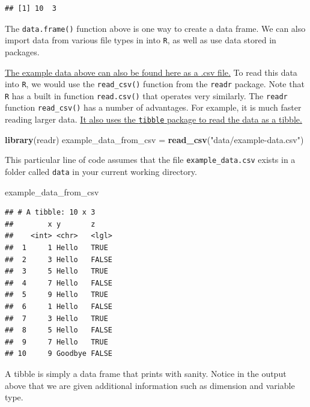 \documentclass[]{book}
\newenvironment{Shaded}{\begin{snugshade}}{\end{snugshade}}
\newcommand{\KeywordTok}[1]{\textcolor[rgb]{0.13,0.29,0.53}{\textbf{#1}}}
\newcommand{\StringTok}[1]{\textcolor[rgb]{0.31,0.60,0.02}{#1}}
\newcommand{\NormalTok}[1]{#1}
\theoremstyle{definition}
\theoremstyle{definition}
\theoremstyle{definition}
\theoremstyle{remark}
\begin{document}
\begin{verbatim}
## [1] 10  3
\end{verbatim}

The \texttt{data.frame()} function above is one way to create a data
frame. We can also import data from various file types in into
\texttt{R}, as well as use data stored in packages.

\href{data/example-data.csv}{The example data above can also be found
here as a .csv file.} To read this data into \texttt{R}, we would use
the \texttt{read\_csv()} function from the \texttt{readr} package. Note
that \texttt{R} has a built in function \texttt{read.csv()} that
operates very similarly. The \texttt{readr} function
\texttt{read\_csv()} has a number of advantages. For example, it is much
faster reading larger data.
\href{https://cran.r-project.org/web/packages/tibble/vignettes/tibble.html}{It
also uses the \texttt{tibble} package to read the data as a tibble.}

\begin{Shaded}
\begin{Highlighting}[]
\KeywordTok{library}\NormalTok{(readr)}
\NormalTok{example_data_from_csv =}\StringTok{ }\KeywordTok{read_csv}\NormalTok{(}\StringTok{"data/example-data.csv"}\NormalTok{)}
\end{Highlighting}
\end{Shaded}

This particular line of code assumes that the file
\texttt{example\_data.csv} exists in a folder called \texttt{data} in
your current working directory.

\begin{Shaded}
\begin{Highlighting}[]
\NormalTok{example_data_from_csv}
\end{Highlighting}
\end{Shaded}

\begin{verbatim}
## # A tibble: 10 x 3
##        x y       z    
##    <int> <chr>   <lgl>
##  1     1 Hello   TRUE 
##  2     3 Hello   FALSE
##  3     5 Hello   TRUE 
##  4     7 Hello   FALSE
##  5     9 Hello   TRUE 
##  6     1 Hello   FALSE
##  7     3 Hello   TRUE 
##  8     5 Hello   FALSE
##  9     7 Hello   TRUE 
## 10     9 Goodbye FALSE
\end{verbatim}

A tibble is simply a data frame that prints with sanity. Notice in the
output above that we are given additional information such as dimension
and variable type.
\end{document}
